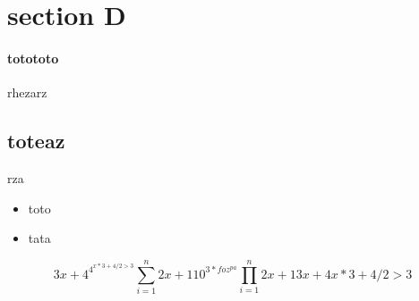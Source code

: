 \documentclass{article}
\begin{document}
\section{section D}{\paragraph{totototo}{rhezarz}\subsection{toteaz}{rza}}
\begin{itemize}
	 \item toto
	        \item tata
   
	        
	        
	        
	        
	        
\end{itemize}

\begin{equation}
3x+4^{4^{x*3+4/2 > 3}}
{\sum_{i=1 }^{n} 2x+1} 
10^{3*foz^{pa}}
{\prod_{i=1 }^{n} 2x+1}
3x+4x*3+4/2 > 3
\end{equation}
\end{document}
